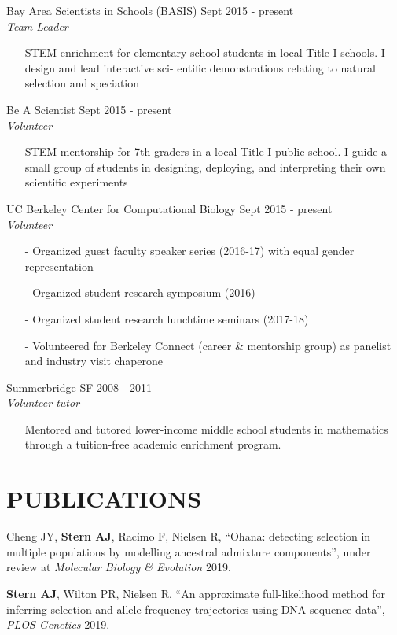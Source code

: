 \documentclass[margin, 10pt]{res} %
\begin{document}
\begin{resume}
Bay Area Scientists in Schools (BASIS) \hfill Sept 2015 - present\\
{\sl Team Leader}
\begin{itemize}
\item[] STEM enrichment for elementary school students in local Title I schools. I design and lead interactive sci- entific demonstrations relating to natural selection and speciation
\end{itemize} 
Be A Scientist \hfill Sept 2015 - present\\
{\sl Volunteer}
\begin{itemize}
\item[] STEM mentorship for 7th-graders in a local Title I public school. I guide a small group of students in designing, deploying, and interpreting their own scientific experiments
\end{itemize} 
UC Berkeley Center for Computational Biology \hfill Sept 2015 - present\\
{\sl Volunteer}
\begin{itemize}
\item[-] Organized guest faculty speaker series (2016-17) with equal gender representation
\item[-] Organized student research symposium (2016)
\item[-] Organized student research lunchtime seminars (2017-18)
\item[-] Volunteered for Berkeley Connect (career \& mentorship group) as panelist and industry visit chaperone
\end{itemize}
Summerbridge SF \hfill 2008 - 2011\\
{\sl Volunteer tutor}
\begin{itemize}
\item[] Mentored and tutored lower-income middle school students in mathematics through a tuition-free academic enrichment program.
\end{itemize}

\section{PUBLICATIONS}

Cheng JY, {\bf Stern AJ}, Racimo F, Nielsen R, ``Ohana: detecting selection in multiple populations by
modelling ancestral admixture components'', under review at {\it Molecular Biology \& Evolution} 2019.

{\bf Stern AJ}, Wilton PR, Nielsen R, ``An approximate full-likelihood method for inferring selection and allele frequency trajectories using DNA sequence data'', {\it PLOS Genetics} 2019.


\end{resume}
\end{document}
